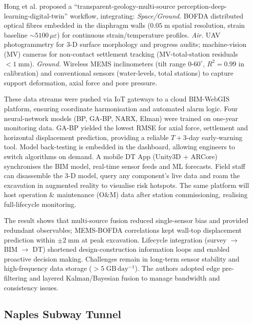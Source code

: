 \documentclass[preprint,11pt,authoryear,3p]{elsarticle}
\begin{document}
Hong et al. proposed a “transparent-geology-multi-source perception-deep-learning-digital-twin” workflow, integrating: \emph{Space/Ground.} BOFDA distributed optical fibres embedded in the diaphragm walls ($0.05\;\mathrm{m}$ spatial resolution, strain baseline $\sim\!5100\,\mu\varepsilon$) for continuous strain/temperature profiles. \emph{Air.} UAV photogrammetry for 3-D surface morphology and progress audits; machine-vision (MV) cameras for non-contact settlement tracking (MV-total-station residuals $<\!1\;\mathrm{mm}$). \emph{Ground.} Wireless MEMS inclinometers (tilt range $0$-$60^{\circ}$, $R^{2}=0.99$ in calibration) and conventional sensors (water-levels, total stations) to capture support deformation, axial force and pore pressure.

These data streams were pushed via IoT gateways to a cloud BIM-WebGIS platform, ensuring coordinate harmonisation and automated alarm logic. Four neural-network models (BP, GA-BP, NARX, Elman) were trained on one-year monitoring data.  GA-BP yielded the lowest RMSE for axial force, settlement and horizontal displacement prediction, providing a reliable $T\!+\!3$-day early-warning tool.  Model back-testing is embedded in the dashboard, allowing engineers to switch algorithms on demand.
A mobile DT App (Unity3D + ARCore) synchronises the BIM model, real-time sensor feeds and ML forecasts.  Field staff can disassemble the 3-D model, query any component’s live data and roam the excavation in augmented reality to visualise risk hotspots.  The same platform will host operation \& maintenance (O\&M) data after station commissioning, realising full-lifecycle monitoring.

The result shows that multi-source fusion reduced single-sensor bias and provided redundant observables; MEMS-BOFDA correlations kept wall-top displacement prediction within $\pm2\;\mathrm{mm}$ at peak excavation. Lifecycle integration (survey $\rightarrow$ BIM $\rightarrow$ DT) shortened design-construction information loops and enabled proactive decision making. Challenges remain in long-term sensor stability and high-frequency data storage ($>5\;\mathrm{GB\,day^{-1}}$). The authors adopted edge pre-filtering and layered Kalman/Bayesian fusion to manage bandwidth and consistency issues.

\subsection{Naples Subway Tunnel}
\end{document}
